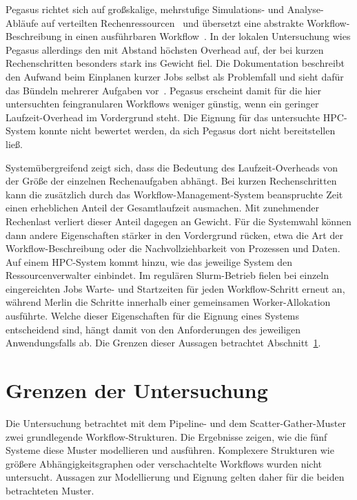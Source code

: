 Pegasus richtet sich auf großskalige, mehrstufige Simulations- und
Analyse-Abläufe auf verteilten
Rechenressourcen~\cite[S.~17]{deelman2015pegasus} und übersetzt eine
abstrakte Workflow-Beschreibung in einen ausführbaren
Workflow~\cite[S.~18]{deelman2015pegasus}. In der lokalen
Untersuchung wies Pegasus allerdings den mit Abstand höchsten
Overhead auf, der bei kurzen Rechenschritten besonders stark ins
Gewicht fiel. Die Dokumentation beschreibt den Aufwand beim
Einplanen kurzer Jobs selbst als Problemfall und sieht dafür das
Bündeln mehrerer Aufgaben vor~\cite{pegasusdocs-optimizing}.
Pegasus erscheint damit für die hier untersuchten feingranularen
Workflows weniger günstig, wenn ein geringer Laufzeit-Overhead im
Vordergrund steht. Die Eignung für das untersuchte HPC-System
konnte nicht bewertet werden, da sich Pegasus dort nicht
bereitstellen ließ.

Systemübergreifend zeigt sich, dass die Bedeutung des
Laufzeit-Overheads von der Größe der einzelnen Rechenaufgaben
abhängt. Bei kurzen Rechenschritten kann die zusätzlich durch das
Workflow-Management-System beanspruchte Zeit einen erheblichen
Anteil der Gesamtlaufzeit ausmachen. Mit zunehmender Rechenlast
verliert dieser Anteil dagegen an Gewicht. Für die Systemwahl können dann andere Eigenschaften stärker in den Vordergrund rücken, etwa die Art der Workflow-Beschreibung oder die
Nachvollziehbarkeit von Prozessen und Daten. Auf einem HPC-System
kommt hinzu, wie das jeweilige System den Ressourcenverwalter
einbindet. Im regulären Slurm-Betrieb fielen bei einzeln
eingereichten Jobs Warte- und Startzeiten für jeden
Workflow-Schritt erneut an, während Merlin die Schritte innerhalb
einer gemeinsamen Worker-Allokation ausführte. Welche dieser
Eigenschaften für die Eignung eines Systems entscheidend sind,
hängt damit von den Anforderungen des jeweiligen Anwendungsfalls
ab. Die Grenzen dieser Aussagen betrachtet
Abschnitt~\ref{sec:diskussion:grenzen}.

\section{Grenzen der Untersuchung}
\label{sec:diskussion:grenzen}

Die Untersuchung betrachtet mit dem Pipeline- und dem
Scatter-Gather-Muster zwei grundlegende Workflow-Strukturen. Die
Ergebnisse zeigen, wie die fünf Systeme diese Muster modellieren
und ausführen. Komplexere Strukturen wie größere
Abhängigkeitsgraphen oder verschachtelte Workflows wurden nicht untersucht. Aussagen zur Modellierung und Eignung gelten daher für die beiden betrachteten
Muster.

